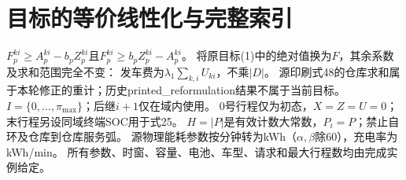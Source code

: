 \documentclass[11pt]{ctexart}
\begin{document}
\section*{目标的等价线性化与完整索引}
$F_p^{ki}\ge A_p^{ki}-b_pZ_p^{ki}$且$F_p^{ki}\ge b_pZ_p^{ki}-A_p^{ki}$。
将原目标(1)中的绝对值换为$F$，其余系数及求和范围完全不变：
发车费为$\lambda_1\sum_{k,i}U_{ki}$，不乘$|D|$。
源印刷式48的仓库求和属于本轮修正的重计；历史printed\_reformulation结果不属于当前目标。
$I=\{0,\ldots,\pi_{\max}\}$；后继$i+1$仅在域内使用。
0号行程仅为初态，$X=Z=U=0$；末行程另设同域终端SOC用于式25。
$H=|P|$是有效计数大常数，$P_i=P$；禁止自环及仓库到仓库服务弧。
源物理能耗参数按分钟转为kWh（$\alpha,\beta$除60），充电率为kWh/min。
所有参数、时窗、容量、电池、车型、请求和最大行程数均由完成实例给定。
\end{document}
